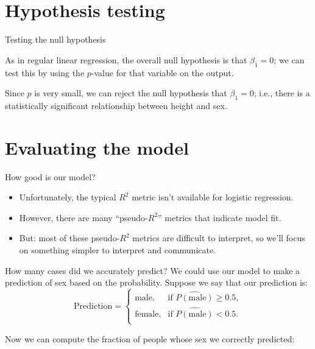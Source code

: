 \documentclass{beamer}\usepackage[]{graphicx}\usepackage[]{color}
\begin{document}
\begin{darkframes}
    \section{Hypothesis testing}

    \begin{frame}{Testing the null hypothesis}
      \begin{center}
        As in regular linear regression, the overall null hypothesis is that $\beta_1=0$; we can test this by using the $p$-value for that variable on the output.

        \bigskip\pause
        Since $p$ is very small, we can reject the null hypothesis that $\beta_1=0$; i.e., there is a statistically significant relationship between height and sex.
      \end{center}
    \end{frame}

    \section{Evaluating the model}

    \begin{frame}{How good is our model?}
      \begin{itemize}[<+->]
        \item Unfortunately, the typical $R^2$ metric isn't available for logistic regression.
        \item However, there are many ``pseudo-$R^2$'' metrics that indicate model fit.
        \item But: most of these pseudo-$R^2$ metrics are difficult to interpret, so we'll focus on something simpler to interpret and communicate.
      \end{itemize}
    \end{frame}

    \begin{frame}[fragile]{How many cases did we accurately predict?}
      We could use our model to make a prediction of sex based on the probability. Suppose we say that our prediction is:
      \[
        \text{Prediction} = \begin{cases}
          \text{male}, & \text{if $\widehat{P(\text{male})} \geq 0.5$}, \\
          \text{female}, & \text{if $\widehat{P(\text{male})} < 0.5$}. \\
        \end{cases}
      \]

      \pause
      Now we can compute the fraction of people whose sex we correctly predicted:


\end{frame}
\end{darkframes}
\end{document}
